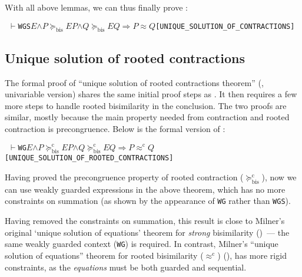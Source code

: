 \documentclass[GCNS]{yincog}
\renewcommand{\HOLinline}[1]{\mbox{\textup{\texttt{#1}}}}
\renewcommand{\HOLConst}[1]{\texttt{#1}}
\renewcommand{\HOLFreeVar}[1]{\ensuremath{\mathit{#1}}}
\renewcommand{\HOLSymConst}[1]{#1}
\renewcommand{\HOLTokenConj}{\ensuremath{\wedge}}
\renewcommand{\HOLTokenTurnstile}{\ensuremath{\:\:\vdash}}
\theoremstyle{remark}
\theoremstyle{theorem}
\theoremstyle{remark}
\newcommand{\HOLTokenWeakEQ}{$\approx$}
\newcommand{\HOLTokenObsCongr}{$\approx^{\mathrm{c}}\!$}
\newcommand{\HOLTokenContracts}{$\succeq_{\mathrm{bis}}\!$}
\newcommand{\HOLTokenObsContracts}{$\succeq^{\mathrm{c}}_{\mathrm{bis}}\!$}
\renewcommand{\HOLTokenImp}{\ensuremath{\Longrightarrow}}
\newcommand{\univariate}{univariable\xspace}
\newcommand{\rapprox}{\mathrel{\approx^{\mathrm{c}}}}
\newcommand{\rcontr}{\mathrel{\succeq^{\mathrm{c}}_{\mathrm{bis}}}}
\begin{document}
With all above lemmas, we can thus finally prove :
%
\begin{alltt}
\HOLTokenTurnstile{} \HOLConst{WGS} \HOLFreeVar{E} \HOLSymConst{\HOLTokenConj{}} \HOLFreeVar{P} \HOLSymConst{\HOLTokenContracts{}} \HOLFreeVar{E} \HOLFreeVar{P} \HOLSymConst{\HOLTokenConj{}} \HOLFreeVar{Q} \HOLSymConst{\HOLTokenContracts{}} \HOLFreeVar{E} \HOLFreeVar{Q} \HOLSymConst{\HOLTokenImp{}} \HOLFreeVar{P} \HOLSymConst{\HOLTokenWeakEQ} \HOLFreeVar{Q}\hfill{[UNIQUE\_SOLUTION\_OF\_CONTRACTIONS]}
\end{alltt}

\subsection{Unique solution of rooted contractions}
 \label{sec4.12}

The formal proof of ``unique solution of rooted contractions theorem''
(, \univariate version) shares the
same initial proof steps as . It then
requires a few more steps to handle rooted bisimilarity in the conclusion.
The two proofs are similar, mostly because the main property needed from
contraction and rooted contraction is precongruence. Below is the formal
version of :
%
\begin{alltt}
\HOLTokenTurnstile{} \HOLConst{WG} \HOLFreeVar{E} \HOLSymConst{\HOLTokenConj{}} \HOLFreeVar{P} \HOLSymConst{\HOLTokenObsContracts} \HOLFreeVar{E} \HOLFreeVar{P} \HOLSymConst{\HOLTokenConj{}} \HOLFreeVar{Q} \HOLSymConst{\HOLTokenObsContracts} \HOLFreeVar{E} \HOLFreeVar{Q} \HOLSymConst{\HOLTokenImp{}} \HOLFreeVar{P} \HOLSymConst{\HOLTokenObsCongr} \HOLFreeVar{Q}\hfill{[UNIQUE\_SOLUTION\_OF\_ROOTED\_CONTRACTIONS]}
\end{alltt}

Having proved the precongruence property of rooted contraction ($
\rcontr $), now we can use weakly guarded expressions in the above theorem,
which has no more constraints on summation (as shown by the appearance
of \HOLinline{\HOLConst{WG}} rather than \HOLinline{\HOLConst{WGS}}).

Having removed the constraints on summation, this result is close to Milner's
original `unique solution of equations' theorem for \emph{strong} bisimilarity
()~--- the same weakly guarded context (\HOLinline{\HOLConst{WG}})
is required. In contrast, Milner's ``unique solution of equations'' theorem
for rooted bisimilarity ($\rapprox $) (), has more
rigid constraints, as the \emph{equations} must be both guarded and sequential.
\end{document}
